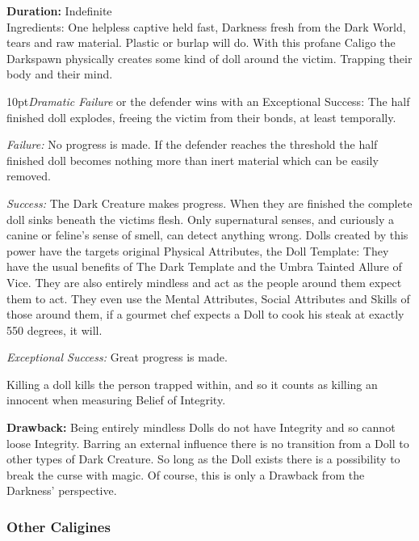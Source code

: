\noindent \textbf{Duration:} Indefinite \\

\noindent Ingredients: One helpless captive held fast, Darkness fresh from the Dark World, tears and raw material. Plastic or burlap will do. With this profane Caligo the Darkspawn physically creates some kind of doll around the victim. Trapping their body and their mind.

    \begin{myindentpar}{10pt}\emph{Dramatic Failure} or the defender wins with an Exceptional Success: The half finished doll explodes, freeing the victim from their bonds, at least temporally.

    \emph{Failure:} No progress is made. If the defender reaches the threshold the half finished doll becomes nothing more than inert material which can be easily removed.

    \emph{Success:} The Dark Creature makes progress. When they are finished the complete doll sinks beneath the victims flesh. Only supernatural senses, and curiously a canine or feline's sense of smell, can detect anything wrong. Dolls created by this power have the targets original Physical Attributes, the Doll Template: They have the usual benefits of The Dark Template and the Umbra Tainted Allure of Vice. They are also entirely mindless and act as the people around them expect them to act. They even use the Mental Attributes, Social Attributes and Skills of those around them, if a gourmet chef expects a Doll to cook his steak at exactly 550 degrees, it will.

    \emph{Exceptional Success:} Great progress is made.\\ \end{myindentpar}

Killing a doll kills the person trapped within, and so it counts as killing an innocent when measuring Belief of Integrity.

\textbf{Drawback:} Being entirely mindless Dolls do not have Integrity and so cannot loose Integrity. Barring an external influence there is no transition from a Doll to other types of Dark Creature. So long as the Doll exists there is a possibility to break the curse with magic. Of course, this is only a Drawback from the Darkness' perspective.

\subsubsection*{Other Caligines}

